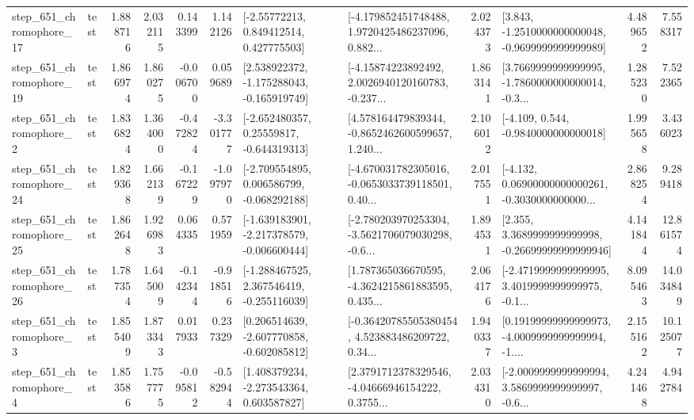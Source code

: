 \begin{tabular}{llrrrrllrlrr}
  step\_651\_chromophore\_17 &      test &      1.888716 &    2.032115 &      0.143399 &  1.142126 &     [-2.55772213, 0.849412514, 0.427775503] &  [-4.179852451748488, 1.9720425486237096, 0.882... &       2.024373 &  [3.843, -1.2510000000000048, -0.9699999999999989] &            4.489652 &          7.558317 \\
  step\_651\_chromophore\_19 &      test &      1.866974 &    1.860275 &     -0.006700 &  0.059689 &   [2.538922372, -1.175288043, -0.165919749] &  [-4.15874223892492, 2.0026940120160783, -0.237... &       1.863141 &  [3.7669999999999995, -1.7860000000000014, -0.3... &            1.285230 &          7.522365 \\
   step\_651\_chromophore\_2 &      test &      1.836824 &    1.364000 &     -0.472824 & -3.301777 &    [-2.652480357, 0.25559817, -0.644319313] &  [4.578164479839344, -0.8652462600599657, 1.240... &       2.106012 &               [-4.109, 0.544, -0.9840000000000018] &            1.995658 &          3.436023 \\
  step\_651\_chromophore\_24 &      test &      1.829368 &    1.662139 &     -0.167229 & -1.097970 &   [-2.709554895, 0.006586799, -0.068292188] &  [-4.670031782305016, -0.0653033739118501, 0.40... &       2.017551 &  [-4.132, 0.06900000000000261, -0.3030000000000... &            2.868254 &          9.289418 \\
  step\_651\_chromophore\_25 &      test &      1.862648 &    1.926983 &      0.064335 &  0.571959 &  [-1.639183901, -2.217378579, -0.006600444] &  [-2.780203970253304, -3.5621706079030298, -0.6... &       1.894531 &  [2.355, 3.3689999999999998, -0.26699999999999946] &            4.141844 &         12.861574 \\
  step\_651\_chromophore\_26 &      test &      1.787354 &    1.645009 &     -0.142344 & -0.918516 &   [-1.288467525, 2.367546419, -0.255116039] &  [1.787365036670595, -4.3624215861883595, 0.435... &       2.064176 &  [-2.4719999999999995, 3.4019999999999975, -0.1... &            8.095463 &         14.034849 \\
   step\_651\_chromophore\_3 &      test &      1.855409 &    1.873343 &      0.017933 &  0.237329 &   [0.206514639, -2.607770858, -0.602085812] &  [-0.36420785505380454, 4.523883486209722, 0.34... &       1.940337 &  [0.19199999999999973, -4.0009999999999994, -1.... &            2.155162 &         10.125077 \\
   step\_651\_chromophore\_4 &      test &      1.853586 &    1.757775 &     -0.095812 & -0.582944 &    [1.408379234, -2.273543364, 0.603587827] &  [2.3791712378329546, -4.04666946154222, 0.3755... &       2.034310 &  [-2.0009999999999994, 3.5869999999999997, -0.6... &            4.241468 &          4.942784 \\

\end{tabular}
